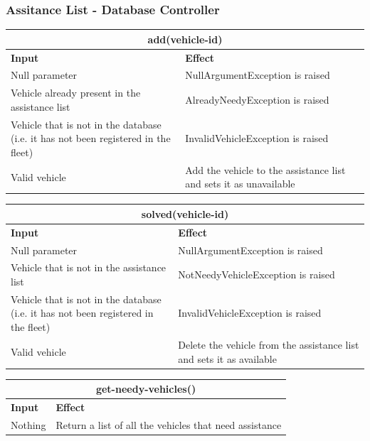\documentclass{article}
\begin{document}
\subsubsection{Assitance List - Database Controller}
\begin{tabular}{ |p{5cm}|p{7cm}| }
  \hline
  \multicolumn{2}{|c|}{add(vehicle-id)} \\
  \hline
  \textbf{Input} & \textbf{Effect} \\
  \hline
  Null parameter & NullArgumentException is raised\\
  \hline
  Vehicle already present in the assistance list & AlreadyNeedyException is raised\\
  \hline
  Vehicle that is not in the database (i.e. it has not been registered in the fleet) & InvalidVehicleException is raised\\
  \hline
  Valid vehicle & Add the vehicle to the assistance list and sets it as unavailable\\
  \hline
\end{tabular}
\newline
\begin{tabular}{ |p{5cm}|p{7cm}| }
  \hline
  \multicolumn{2}{|c|}{solved(vehicle-id)} \\
  \hline
  \textbf{Input} & \textbf{Effect} \\
  \hline
  Null parameter & NullArgumentException is raised\\
  \hline
  Vehicle that is not in the assistance list & NotNeedyVehicleException is raised\\
  \hline
  Vehicle that is not in the database (i.e. it has not been registered in the fleet) & InvalidVehicleException is raised\\
  \hline
  Valid vehicle & Delete the vehicle from the assistance list and sets it as available\\
  \hline
\end{tabular}
\newline
\begin{tabular}{ |p{5cm}|p{7cm}| }
  \hline
  \multicolumn{2}{|c|}{get-needy-vehicles()} \\
  \hline
  \textbf{Input} & \textbf{Effect} \\
  \hline
  Nothing & Return a list of all the vehicles that need assistance\\
  \hline
\end{tabular}
\end{document}
